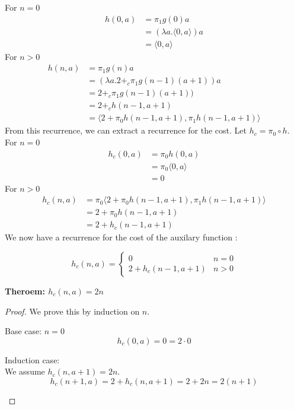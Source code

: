 %
For $n=0$
%
\begin{align*}
h(0,a) &= \pi_1 g(0) a \\
&= (\lambda a.\langle 0,a\rangle) a \\
&= \langle 0, a\rangle
\end{align*}
%
For $n>0$
%
\begin{align*}
h(n,a) &= \pi_1 g(n) a \\ 
&= (\lambda a. 2 +_c \pi_1g(n-1) (a+1)) a \\
&= 2 +_c \pi_1 g(n-1) (a+1)) \\
&= 2 +_c h(n-1,a+1) \\
&= \langle 2 + \pi_0 h(n-1,a+1), \pi_1 h(n-1,a+1)\rangle
\end{align*}
%
From this recurrence, we can extract a recurrence for the cost. Let $h_c = \pi_0 \circ h$.
%
For $n=0$
%
\begin{align*}
h_c(0,a) &= \pi_0 h(0,a)\\
&= \pi_0 \langle 0, a\rangle\\
&= 0
\end{align*}
%
For $n>0$
%
\begin{align*}
h_c(n,a) &= \pi_0 \langle 2 + \pi_0 h(n-1,a+1), \pi_1 h(n-1,a+1)\rangle\\
&= 2 + \pi_0 h(n-1,a+1)\\
&= 2 + h_c(n-1,a+1)
\end{align*}
%
We now have a recurrence for the cost of the auxilary function :
\begin{framed}
  \begin{equation}
    h_c(n,a) = \begin{cases}
      0 & n = 0 \\
      2 + h_c(n-1,a+1) & n > 0
    \end{cases}
  \end{equation}
\end{framed}

\textbf{Theroem: $h_c(n,a) = 2n$}
\begin{proof}
  We prove this by induction on $n$.
  \begin{description}
    \item{Base case: $n=0$}\hfill \\
      \[ h_c(0,a) = 0 = 2\cdot0 \]
    \item{Induction case:}\hfill \\
      We assume $h_c(n,a+1) = 2n$.\[h_c(n+1,a) = 2 + h_c(n,a+1) = 2 + 2n = 2(n+1)\]
  \end{description}
\end{proof}  

